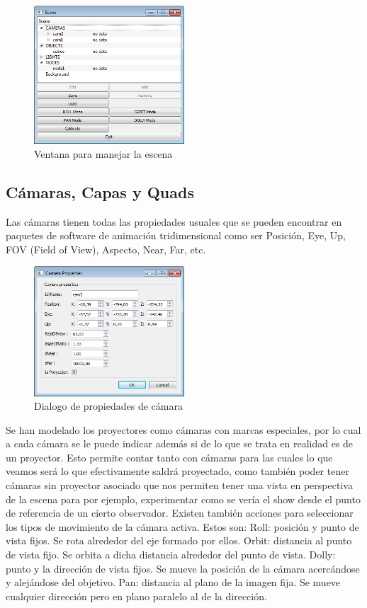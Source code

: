 \begin{figure}[H]
  \centering
    \includegraphics[width=0.5\textwidth]{./Cap5_vmt/vmt_scene.png}
  \caption{Ventana para manejar la escena}
  \label{fig:VMT-SceneWindow}
\end{figure}

\subsection{Cámaras, Capas y Quads}
Las cámaras tienen todas las propiedades usuales que se pueden encontrar en paquetes de software de animación tridimensional como ser Posición, Eye, Up, FOV (Field of View), Aspecto, Near, Far, etc.

\begin{figure}[H]
  \centering
    \includegraphics[width=0.5\textwidth]{./Cap5_vmt/vmt_cameraProperties.png}
  \caption{Dialogo de propiedades de cámara}
  \label{fig:VMT-CameraProperties}
\end{figure}

Se han modelado los proyectores como cámaras con marcas especiales, por lo cual a cada cámara se le puede indicar además si de lo que se trata en realidad es de un proyector. Esto permite contar tanto con cámaras para las cuales lo que veamos será lo que efectivamente saldrá proyectado, como también poder tener cámaras sin proyector asociado que nos permiten tener una vista en perspectiva de la escena para por ejemplo, experimentar como se vería el show desde el punto de referencia de un cierto observador.
Existen también acciones para seleccionar los tipos de movimiento de la cámara activa. Estos son:
Roll: posición y punto de vista fijos. Se rota alrededor del eje formado por ellos.
Orbit: distancia al punto de vista fijo. Se orbita a dicha distancia alrededor del punto de vista.
Dolly: punto y la dirección de vista fijos. Se mueve la posición de la cámara acercándose y alejándose del objetivo.
Pan: distancia al plano de la imagen fija. Se mueve cualquier dirección pero en plano paralelo al de la dirección.

